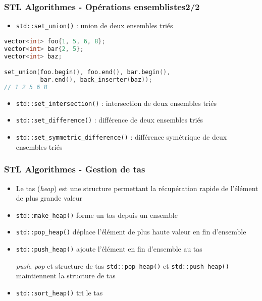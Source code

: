 \documentclass[C++.tex]{subfiles}
\begin{document}
\begin{frame}[fragile]
	\frametitle{STL Algorithmes - Opérations ensemblistes\titlehfill{}2/2}
	\begin{itemize}
		\item \lstinline|std::set_union()| : union de deux ensembles triés
	\end{itemize}

	\begin{lstlisting}[language=C++]
vector<int> foo{1, 5, 6, 8};
vector<int> bar{2, 5};
vector<int> baz;

set_union(foo.begin(), foo.end(), bar.begin(),
          bar.end(), back_inserter(baz));
// 1 2 5 6 8\end{lstlisting}

	\begin{itemize}
		\item \lstinline|std::set_intersection()| : intersection de deux ensembles triés
		\item \lstinline|std::set_difference()| : différence de deux ensembles triés
		\item \lstinline|std::set_symmetric_difference()| : différence symétrique de deux ensembles triés

	\end{itemize}
\end{frame}

\begin{frame}[fragile]
	\frametitle{STL Algorithmes - Gestion de \og tas\fg{}}
	\begin{itemize}
		\item Le tas (\textit{heap}) est une structure permettant la récupération rapide de l'élément de plus grande valeur
		\item \lstinline|std::make_heap()| forme un tas depuis un ensemble
		\item \lstinline|std::pop_heap()| déplace l'élément de plus haute valeur en fin d'ensemble
		\item \lstinline|std::push_heap()| ajoute l'élément en fin d'ensemble au tas

		\begin{block}{\textit{push}, \textit{pop} et structure de tas}
			\lstinline|std::pop_heap()| et \lstinline|std::push_heap()| maintiennent la structure de tas
		\end{block}

		\item \lstinline|std::sort_heap()| tri le tas
	\end{itemize}
\end{frame}
\end{document}
